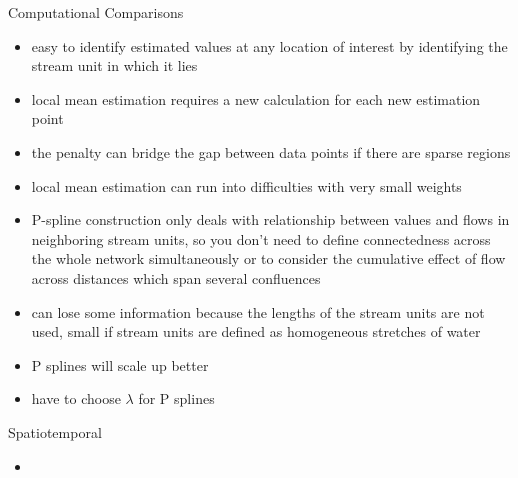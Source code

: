 \documentclass[12pt]{amsart}
\begin{document}
Computational Comparisons
\begin{itemize}
\item easy to identify estimated values at any location of interest by identifying the stream unit in which it lies
\item local mean estimation requires a new calculation for each new estimation point
\item the penalty can bridge the gap between data points if there are sparse regions
\item local mean estimation can run into difficulties with very small weights
\item P-spline construction only deals with relationship between values and flows in neighboring stream units, so you don't need to define connectedness across the whole network simultaneously or to consider the cumulative effect of flow across distances which span several confluences
\item can lose some information because the lengths of the stream units are not used, small if stream units are defined as homogeneous stretches of water
\item P splines will scale up better
\item have to choose $\lambda$ for P splines
\end{itemize}

Spatiotemporal
\begin{itemize}
\item 
\end{itemize}
\end{document}
